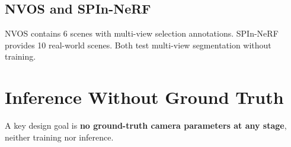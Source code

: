 \subsection{NVOS and SPIn-NeRF}

NVOS contains 6 scenes with multi-view selection annotations. SPIn-NeRF provides 10 real-world scenes. Both test multi-view segmentation without training.



\section{Inference Without Ground Truth}
\label{app:inference}

A key design goal is \textbf{no ground-truth camera parameters at any stage}, neither training nor inference.



